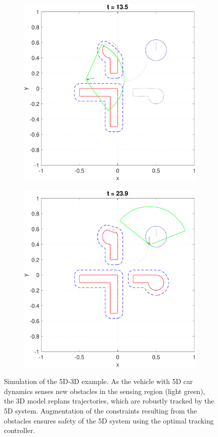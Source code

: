 \begin{figure}
  \begin{subfigure}[t]{0.49\columnwidth}
    \includegraphics[width=\columnwidth]{fig/P5D_Dubins/136}
  \end{subfigure}
  \begin{subfigure}[t]{0.49\columnwidth}
    \includegraphics[width=\columnwidth]{fig/P5D_Dubins/240}
  \end{subfigure}
  \caption{Simulation of the 5D-3D example. As the vehicle with 5D car dynamics senses new obstacles in the sensing region (light green), the 3D model replans trajectories, which are robustly tracked by the 5D system. Augmentation of the constraints resulting from the obstacles ensures safety of the 5D system using the optimal tracking controller.} \label{fig:5D3Dsim}
\end{figure}

